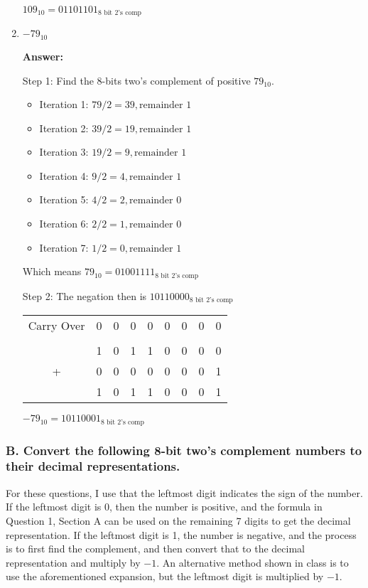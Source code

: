 \documentclass[12pt]{extreport}
\newcommand{\answer}[0]{\medskip \textbf{Answer:} \medskip}
\begin{document}
\begin{enumerate}
        \( 109_{10} =  01101101_{\text{8 bit 2's comp}} \)
        
    \item \( -79_{10} \)
    
        \answer

        Step 1: Find the 8-bits two's complement of positive \( 79_{10} \).

        \begin{itemize}
            \item Iteration 1: \( 79 / 2 = 39, \text{remainder } 1 \)
            \item Iteration 2: \( 39 / 2 = 19, \text{remainder } 1 \)
            \item Iteration 3: \( 19 / 2 = 9, \text{remainder } 1 \)
            \item Iteration 4: \( 9 / 2 = 4, \text{remainder } 1 \)
            \item Iteration 5: \( 4 / 2 = 2, \text{remainder } 0 \)
            \item Iteration 6: \( 2 / 2 = 1, \text{remainder } 0 \)
            \item Iteration 7: \( 1 / 2 = 0, \text{remainder } 1 \)
        \end{itemize}
        Which means \( 79_{10} = 01001111_{\text{8 bit 2's comp}} \)

        \medskip

        Step 2: The negation then is \( 10110000_{\text{8 bit 2's comp}} \)

        \begin{tabular}{ccccccccc}
            Carry Over &0& 0& 0& 0& 0& 0& 0& 0 \\
            \\
            & 1& 0& 1& 1& 0& 0& 0& 0 \\
            + & 0& 0& 0& 0& 0& 0& 0& 1 \\
            \hline
            & 1& 0& 1& 1& 0& 0& 0& 1
        \end{tabular}

        \( -79_{10} = 10110001_{\text{8 bit 2's comp}} \)

\end{enumerate}

\subsubsection{B. Convert the following 8-bit two's complement numbers to their decimal representations.}
For these questions, I use that the leftmost digit indicates the sign of the number. If the leftmost digit is 0, then the number is positive, and the formula in Question 1, Section A can be used on the remaining 7 digits to get the decimal representation. If the leftmost digit is 1, the number is negative, and the process is to first find the complement, and then convert that to the decimal representation and multiply by \( -1 \). An alternative method shown in class is to use the aforementioned expansion, but the leftmost digit is multiplied by \( -1 \).
\end{document}
